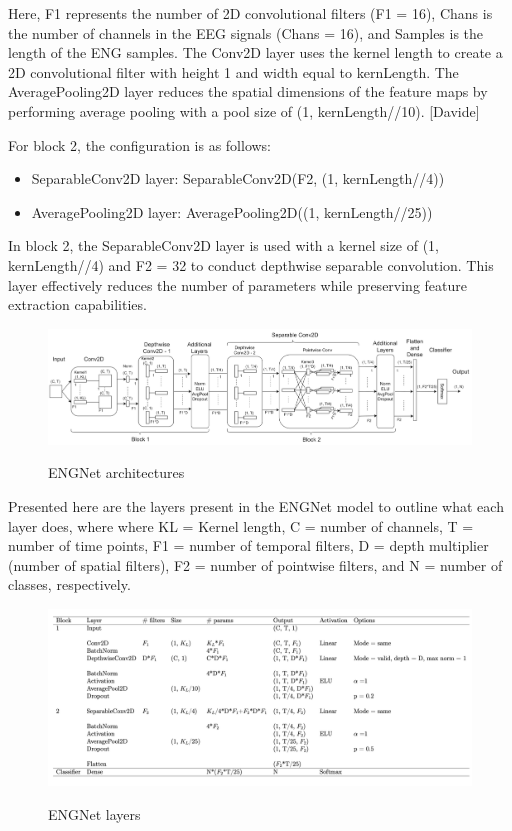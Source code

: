 \documentclass{Configuration_Files/PoliMi3i_thesis}
\begin{document}
Here, F1 represents the number of 2D convolutional filters (F1 = 16), Chans is the number of channels in the EEG signals (Chans = 16), and Samples is the length of the ENG samples. The Conv2D layer uses the kernel length to create a 2D convolutional filter with height 1 and width equal to kernLength. The AveragePooling2D layer reduces the spatial dimensions of the feature maps by performing average pooling with a pool size of (1, kernLength//10). [Davide]

For block 2, the configuration is as follows:
\begin{itemize}
\item SeparableConv2D layer: SeparableConv2D(F2, (1, kernLength//4))
\item AveragePooling2D layer: AveragePooling2D((1, kernLength//25))
\end{itemize}

In block 2, the SeparableConv2D layer is used with a kernel size of (1, kernLength//4) and F2 = 32 to conduct depthwise separable convolution. This layer effectively reduces the number of parameters while preserving feature extraction capabilities.

\begin{figure}[H]
	\includegraphics[scale=0.4]{engNet_arch.png}
	\centering
    \label{engNet_params_2}
    \caption{ENGNet architectures}
\end{figure}

Presented here are the layers present in the ENGNet model to outline what each layer does, where where KL = Kernel length, C = number of channels, T = number of time points, F1 = number of temporal filters, D = depth multiplier (number of spatial filters), F2 = number of pointwise filters, and N = number of classes, respectively.


\begin{figure}[H]
	\includegraphics[scale=0.25]{engNet_layers.png}
	\centering
    \label{engNet_params_3}
    \caption{ENGNet layers}
\end{figure}
\end{document}

